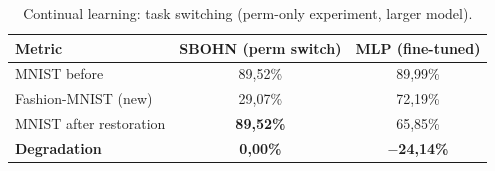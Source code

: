 \begin{table}[htbp]
\centering
\caption{Continual learning: task switching (perm-only experiment, larger model).}
\label{tab:continual_fewshot}
\begin{tabular}{l|c|c}
\hline
\textbf{Metric} & \textbf{SBOHN (perm switch)} & \textbf{MLP (fine-tuned)} \\
\hline
MNIST before            & 89{,}52\% & 89{,}99\% \\
Fashion-MNIST (new)     & 29{,}07\% & 72{,}19\% \\
MNIST after restoration & \textbf{89{,}52\%} & 65{,}85\% \\
\textbf{Degradation}    & \textbf{0{,}00\%} & \textbf{$-$24{,}14\%} \\
\hline
\end{tabular}
\end{table}
